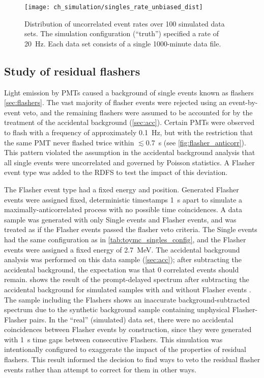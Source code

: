 \begin{figure}
    \centering
    \texttt{[image: ch\_simulation/singles\_rate\_unbiased\_dist]}
    \caption[Extracted simulated uncorrelated event rates]{
        Distribution of uncorrelated event rates over 100 simulated data sets.
        The simulation configuration (``truth'') specified a rate of \SI{20}{\Hz}.
        Each data set consists of a single 1000-minute data file.
    }
    \label{fig:toymc_singles_dist}
\end{figure}

\subsection{Study of residual flashers}
\label{subsec:toymc_flashers}

Light emission by PMTs caused a background of single events
known as flashers \cref{sec:flashers}.
The vast majority of flasher events were rejected using an event-by-event veto,
and the remaining flashers were assumed to be accounted for
by the treatment of the accidental background (\cref{sec:acc}).
Certain PMTs were observed to flash with a frequency
of approximately \SI{0.1}{\Hz},
but with the restriction that
the same PMT never flashed twice within $\lesssim$\SI{0.7}{\s}
(see \cref{fig:flasher_anticorr}).
This pattern violated the assumption in the accidental background analysis
that all single events were uncorrelated and governed by Poisson statistics.
A Flasher event type was added to the RDFS to test the impact of this deviation.

The Flasher event type had a fixed energy and position.
Generated Flasher events were assigned fixed, deterministic timestamps \SI{1}{\s} apart
to simulate a maximally-anticorrelated process with no possible time coincidences.
A data sample was generated with only Single events and Flasher events,
and was treated as if the Flasher events passed the flasher veto criteria.
The Single events had the same configuration as in \cref{tab:toymc_singles_config},
and the Flasher events were assigned a fixed energy of \SI{2.7}{\MeV}.
The accidental background analysis was performed on this data sample (\cref{sec:acc});
after subtracting the accidental background,
the expectation was that 0 correlated events should remain.
 shows the result of the prompt-delayed spectrum
after subtracting the accidental background
for simulated samples with and without Flasher events \cite{flasher_sim}.
The sample including the Flashers shows
an inaccurate background-subtracted spectrum
due to the synthetic background sample containing unphysical Flasher-Flasher pairs.
In the ``real'' (simulated) data set,
there were no accidental coincidences between Flasher events by construction,
since they were generated with \SI{1}{\s} time gaps
between consecutive Flashers.
This simulation was intentionally configured to exaggerate the impact
of the properties of residual flashers.
This result informed the decision to find ways to veto the residual flasher events
rather than attempt to correct for them in other ways.


